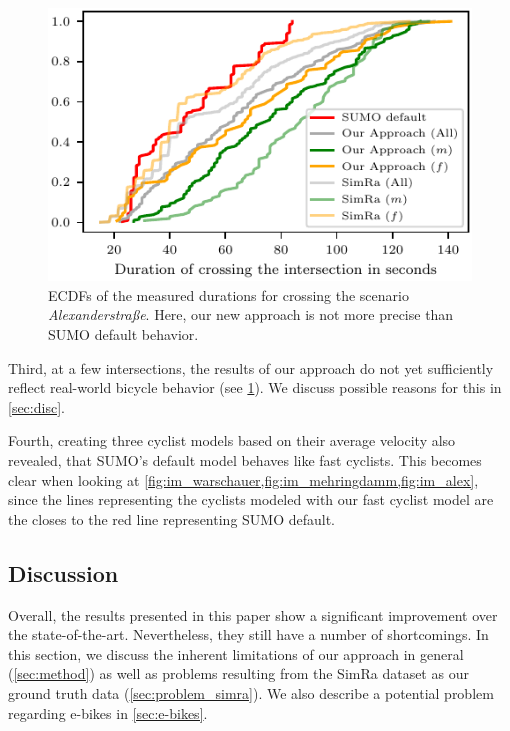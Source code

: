\begin{figure}[t]
    \centering
    \includegraphics[width=\columnwidth]{fig/im_alex_ecdf_every.pdf}
    \caption{%
        ECDFs of the measured durations for crossing the scenario \textit{Alexanderstraße}.
        Here, our new approach is not more precise than SUMO default behavior.
    }%
    \label{fig:im_alex}
\end{figure}

Third, at a few intersections, the results of our approach do not yet sufficiently reflect real-world bicycle behavior (see \cref{fig:im_alex}).
We discuss possible reasons for this in \cref{sec:disc}.

Fourth, creating three cyclist models based on their average velocity also revealed, that SUMO's default model behaves like fast cyclists.
This becomes clear when looking at \cref{fig:im_warschauer,fig:im_mehringdamm,fig:im_alex}, since the lines representing the cyclists modeled with our fast cyclist model are the closes to the red line representing SUMO default.


\subsection{Discussion}
\label{subsec:discussion_sumo}
Overall, the results presented in this paper show a significant improvement over the state-of-the-art.
Nevertheless, they still have a number of shortcomings.
In this section, we discuss the inherent limitations of our approach in general (\cref{sec:method}) as well as problems resulting from the SimRa dataset as our ground truth data (\cref{sec:problem_simra}).
We also describe a potential problem regarding e-bikes in \cref{sec:e-bikes}.


